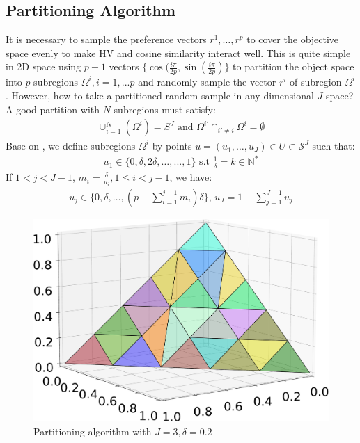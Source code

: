 \documentclass[letterpaper]{article} %
\begin{document}
\subsection{Partitioning Algorithm}
\label{sst:partition}
It is necessary to sample the preference vectors $r^1,\dots, r^p$ to cover the objective space evenly to make HV and cosine similarity interact well. This is quite simple in 2D space using $p+1$ vectors $\{\cos(\frac{i\pi}{2p}, \sin(\frac{i\pi}{2p}) \}$ to partition the object space into $p$ subregions $\Omega^i, i=1,...p$ and randomly sample the vector $r^i$ of subregion $\Omega^i$. However, how to take a partitioned random sample in any dimensional $J$ space? A good partition with $N$ subregions must satisfy:
\begin{align}
    \cup_{i=1}^N (\Omega^i)= S^J \text{ and }  \Omega^{i'} \cap_{i' \neq i} \Omega^i = \emptyset
\end{align}
Base on \cite{das}, we define subregions $\Omega^i$ by points $u=(u_1, \dots, u_J) \in U \subset \mathcal{S}^J$ such that:
\begin{align}
    u_1 \in \{0, \delta, 2\delta, \dots, ..., 1\} \text{ s.t }  \frac{1}{\delta}=k \in \mathbb{N}^*
\end{align}
If $1<j<J-1$, $m_i = \frac{\delta}{u_i}, 1 \leq i<j-1$, we have:
\begin{align}
    u_j \in \{0, \delta, \dots, (p-\sum_{i=1}^{j-1}m_i)\delta\} \text{, }  u_J = 1 - \sum_{j=1}^{J-1}u_j
\end{align}
\begin{figure}[!htb]
    \centering
    \includegraphics[width=0.8\columnwidth]{figures/Partition_resize.pdf}
    \caption{Partitioning algorithm with $J=3, \delta=0.2$}
    \label{fig:partition_result}
\end{figure}
\end{document}
